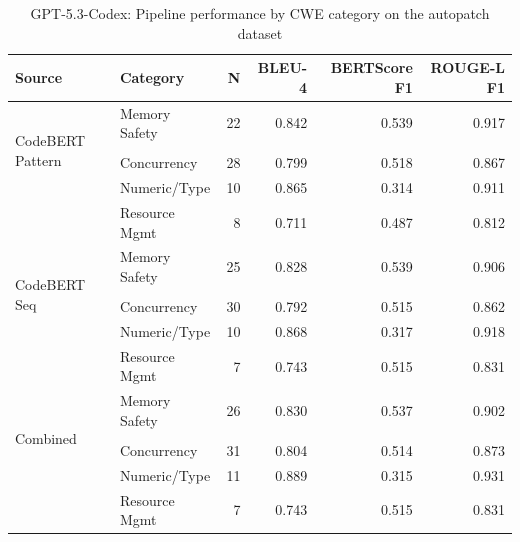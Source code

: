 \begin{table}[H]
  \centering
  \caption{GPT-5.3-Codex: Pipeline performance by CWE category on the autopatch dataset}
  \label{tab:autopatch_pipeline_by_cwe_category_gpt_codex}
  \begin{tabular}{llrrrr}
    \toprule
    Source & Category & N & BLEU-4 & BERTScore F1 & ROUGE-L F1 \\
    \midrule
    \multirow{4}{*}{CodeBERT Pattern} & Memory Safety & 22 & 0.842 & 0.539 & 0.917 \\\\
    & Concurrency & 28 & 0.799 & 0.518 & 0.867 \\
    & Numeric/Type & 10 & 0.865 & 0.314 & 0.911 \\
    & Resource Mgmt & 8 & 0.711 & 0.487 & 0.812 \\
    \midrule
    \multirow{4}{*}{CodeBERT Seq} & Memory Safety & 25 & 0.828 & 0.539 & 0.906 \\\\
    & Concurrency & 30 & 0.792 & 0.515 & 0.862 \\
    & Numeric/Type & 10 & 0.868 & 0.317 & 0.918 \\
    & Resource Mgmt & 7 & 0.743 & 0.515 & 0.831 \\
    \midrule
    \multirow{4}{*}{Combined} & Memory Safety & 26 & 0.830 & 0.537 & 0.902 \\\\
    & Concurrency & 31 & 0.804 & 0.514 & 0.873 \\
    & Numeric/Type & 11 & 0.889 & 0.315 & 0.931 \\
    & Resource Mgmt & 7 & 0.743 & 0.515 & 0.831 \\
    \midrule
    \bottomrule
  \end{tabular}
\end{table}

